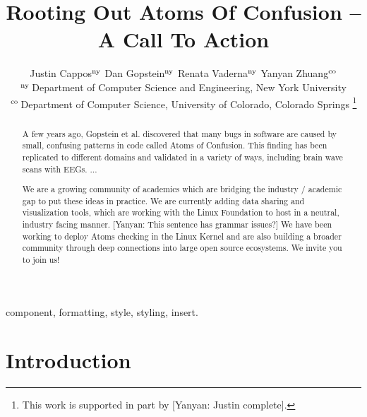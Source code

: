 \documentclass[conference]{IEEEtran}
\begin{document}
\newif\ifrev
\revtrue
\ifrev
  \newcommand{\yanyan}[1]{{\color{blue} [Yanyan: #1]}}
  \newcommand{\red}[1]{\textcolor{red}{#1}}
  \newcommand{\todo}[1]{\textcolor{red}{\textbf{Anyone todo}: #1}}
\else
  \newcommand{\yanyan}[1]{}
  \newcommand{\red}[1]{}
  \newcommand{\todo}[1]{}
\fi

\title{Rooting Out Atoms Of Confusion -- A Call To Action}

\author{Justin Cappos${}^{\rm ny}$ \qquad Dan Gopstein${}^{\rm ny}$ \qquad Renata Vaderna${}^{\rm ny}$ \qquad Yanyan Zhuang${}^{\rm co}$\\
${}^{\rm ny}$\,Department of Computer Science and Engineering, New York University \\ 
${}^{\rm co}$\,Department of Computer Science, University of Colorado, Colorado Springs  \thanks{This work is supported in part by \yanyan{Justin complete}.}
}

\maketitle

\begin{abstract}
A few years ago, Gopstein et al. discovered that many bugs in software are 
caused by small, confusing patterns in code called Atoms of Confusion.  This 
finding has been replicated to different domains and validated in a variety of
ways, including brain wave scans with EEGs.   ...

We are a growing  community of academics which are bridging the industry / 
academic gap to put these ideas in practice.  We are currently adding data 
sharing and visualization tools, which are working with the Linux Foundation 
to host in a neutral, industry facing manner. \yanyan{This sentence has grammar issues?}  We 
have been working to deploy Atoms checking in the Linux Kernel and are also 
building a broader community through deep connections into large open source
ecosystems.  We invite you to join us!
\end{abstract}

\begin{IEEEkeywords}
component, formatting, style, styling, insert.
\end{IEEEkeywords}

\section{Introduction}
\end{document}
